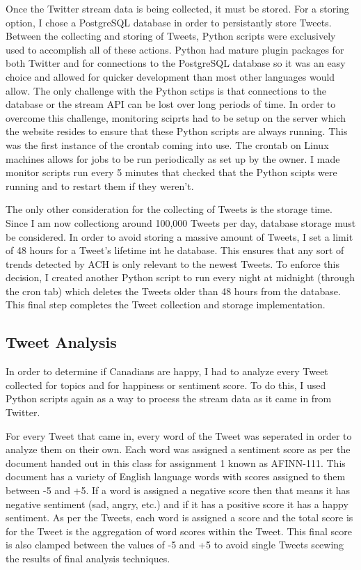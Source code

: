 \documentclass[conference]{IEEEtran}
\begin{document}
Once the Twitter stream data is being collected, it must be stored. For a storing option, I chose a PostgreSQL
database  in order to persistantly store Tweets. Between the collecting and storing of Tweets, Python scripts
were exclusively used to accomplish all of these actions. Python had mature plugin packages for both Twitter
and for connections to the PostgreSQL database so it was an easy choice and allowed for quicker development
than most other languages would allow. The only challenge with the Python sctips is that connections to the
database or the stream API can be lost over long periods of time. In order to overcome this challenge, monitoring
sciprts had to be setup on the server which the website resides to ensure that these Python scripts are always
running. This was the first instance of the crontab coming into use. The crontab on Linux machines allows for
jobs to be run periodically as set up by the owner. I made monitor scripts run every 5 minutes that checked
that the Python scipts were running and to restart them if they weren't.

The only other consideration for the collecting of Tweets is the storage time. Since I am now collectiong
around 100,000 Tweets per day, database storage must be considered. In order to avoid storing a massive
amount of Tweets, I set a limit of 48 hours for a Tweet's lifetime int he database. This ensures that any
sort of trends detected by ACH is only relevant to the newest Tweets. To enforce this decision, I created
another Python script to run every night at midnight (through the cron tab) which deletes the Tweets older
than 48 hours from the database. This final step completes the Tweet collection and storage implementation.

\subsection{Tweet Analysis}

In order to determine if Canadians are happy, I had to analyze every Tweet collected for topics and for
happiness or sentiment score. To do this, I used Python scripts again as a way to process the stream data
as it came in from Twitter. 

For every Tweet that came in, every word of the Tweet was seperated in order to analyze them on their own.
Each word was assigned a sentiment score as per the document handed out in this class for assignment 1
known as AFINN-111. This document has a variety of English language words with scores assigned to them
between -5 and +5. If a word is assigned a negative score then that means it has negative sentiment (sad, 
angry, etc.) and if it has a positive score it has a happy sentiment. As per the Tweets, each word is assigned
a score and the total score is for the Tweet is the aggregation of word scores within the Tweet. This final
score is also clamped between the values of -5 and +5 to avoid single Tweets scewing the results of
final analysis techniques. 
\end{document}
